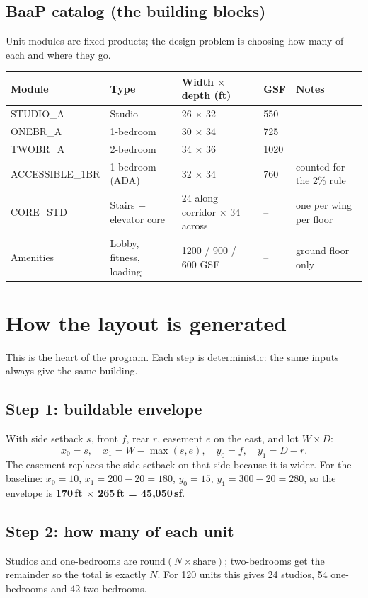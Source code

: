 \documentclass[11pt]{article}
\begin{document}
\subsection{BaaP catalog (the building blocks)}
Unit modules are fixed products; the design problem is choosing how many of each and where they go.
\begin{table}[H]\centering\small
\begin{tabular}{lllll}\toprule
Module & Type & Width $\times$ depth (ft) & GSF & Notes \\ \midrule
STUDIO\_A & Studio & 26 $\times$ 32 & 550 & \\
ONEBR\_A & 1-bedroom & 30 $\times$ 34 & 725 & \\
TWOBR\_A & 2-bedroom & 34 $\times$ 36 & 1020 & \\
ACCESSIBLE\_1BR & 1-bedroom (ADA) & 32 $\times$ 34 & 760 & counted for the 2\% rule \\
CORE\_STD & Stairs + elevator core & 24 along corridor $\times$ 34 across & -- & one per wing per floor \\
Amenities & Lobby, fitness, loading & 1200 / 900 / 600 GSF & -- & ground floor only \\ \bottomrule
\end{tabular}\end{table}

\section{How the layout is generated}
This is the heart of the program. Each step is deterministic: the same inputs always give the same building.

\subsection{Step 1: buildable envelope}
With side setback $s$, front $f$, rear $r$, easement $e$ on the east, and lot $W\times D$:
\[
x_0 = s,\quad x_1 = W - \max(s, e),\quad y_0 = f,\quad y_1 = D - r .
\]
The easement replaces the side setback on that side because it is wider. For the baseline: $x_0=10$, $x_1=200-20=180$, $y_0=15$, $y_1=300-20=280$, so the envelope is
\textbf{170\,ft $\times$ 265\,ft = 45,050\,sf}.

\subsection{Step 2: how many of each unit}
Studios and one-bedrooms are $\text{round}(N\times\text{share})$; two-bedrooms get the remainder so the total is exactly $N$. For 120 units this gives
24 studios, 54 one-bedrooms and 42 two-bedrooms.
\end{document}
